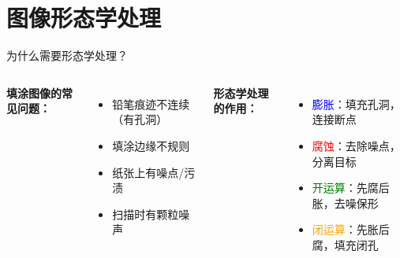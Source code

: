 \section{图像形态学处理}

\begin{frame}{为什么需要形态学处理？}
    \begin{columns}
        \textbf{填涂图像的常见问题：}
        \begin{itemize}
            \item 铅笔痕迹不连续（有孔洞）
            \item 填涂边缘不规则
            \item 纸张上有噪点/污渍
            \item 扫描时有颗粒噪声
        \end{itemize}

        \textbf{形态学处理的作用：}
        \begin{itemize}
            \item \textcolor{blue}{膨胀}：填充孔洞，连接断点
            \item \textcolor{red}{腐蚀}：去除噪点，分离目标
            \item \textcolor{green}{开运算}：先腐后胀，去噪保形
            \item \textcolor{orange}{闭运算}：先胀后腐，填充闭孔
        \end{itemize}
    \end{columns}
\end{frame}

